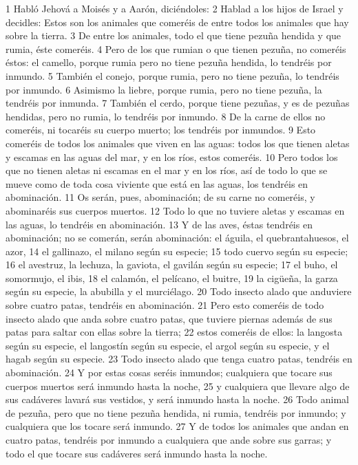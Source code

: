 1 Habló Jehová a Moisés y a Aarón, diciéndoles:
2 Hablad a los hijos de Israel y decidles: Estos son los animales que comeréis de entre todos los animales que hay sobre la tierra.
3 De entre los animales, todo el que tiene pezuña hendida y que rumia, éste comeréis.
4 Pero de los que rumian o que tienen pezuña, no comeréis éstos: el camello, porque rumia pero no tiene pezuña hendida, lo tendréis por inmundo.
5 También el conejo, porque rumia, pero no tiene pezuña, lo tendréis por inmundo.
6 Asimismo la liebre, porque rumia, pero no tiene pezuña, la tendréis por inmunda.
7 También el cerdo, porque tiene pezuñas, y es de pezuñas hendidas, pero no rumia, lo tendréis por inmundo.
8 De la carne de ellos no comeréis, ni tocaréis su cuerpo muerto; los tendréis por inmundos.
9 Esto comeréis de todos los animales que viven en las aguas: todos los que tienen aletas y escamas en las aguas del mar, y en los ríos, estos comeréis.
10 Pero todos los que no tienen aletas ni escamas en el mar y en los ríos, así de todo lo que se mueve como de toda cosa viviente que está en las aguas, los tendréis en abominación.
11 Os serán, pues, abominación; de su carne no comeréis, y abominaréis sus cuerpos muertos.
12 Todo lo que no tuviere aletas y escamas en las aguas, lo tendréis en abominación.
13 Y de las aves, éstas tendréis en abominación; no se comerán, serán abominación: el águila, el quebrantahuesos, el azor,
14 el gallinazo, el milano según su especie;
15 todo cuervo según su especie;
16 el avestruz, la lechuza, la gaviota, el gavilán según su especie;
17 el buho, el somormujo, el ibis,
18 el calamón, el pelícano, el buitre,
19 la cigüeña, la garza según su especie, la abubilla y el murciélago.
20 Todo insecto alado que anduviere sobre cuatro patas, tendréis en abominación.
21 Pero esto comeréis de todo insecto alado que anda sobre cuatro patas, que tuviere piernas además de sus patas para saltar con ellas sobre la tierra;
22 estos comeréis de ellos: la langosta según su especie, el langostín según su especie, el argol según su especie, y el hagab según su especie.
23 Todo insecto alado que tenga cuatro patas, tendréis en abominación.
24 Y por estas cosas seréis inmundos; cualquiera que tocare sus cuerpos muertos será inmundo hasta la noche,
25 y cualquiera que llevare algo de sus cadáveres lavará sus vestidos, y será inmundo hasta la noche.
26 Todo animal de pezuña, pero que no tiene pezuña hendida, ni rumia, tendréis por inmundo; y cualquiera que los tocare será inmundo.
27 Y de todos los animales que andan en cuatro patas, tendréis por inmundo a cualquiera que ande sobre sus garras; y todo el que tocare sus cadáveres será inmundo hasta la noche.
